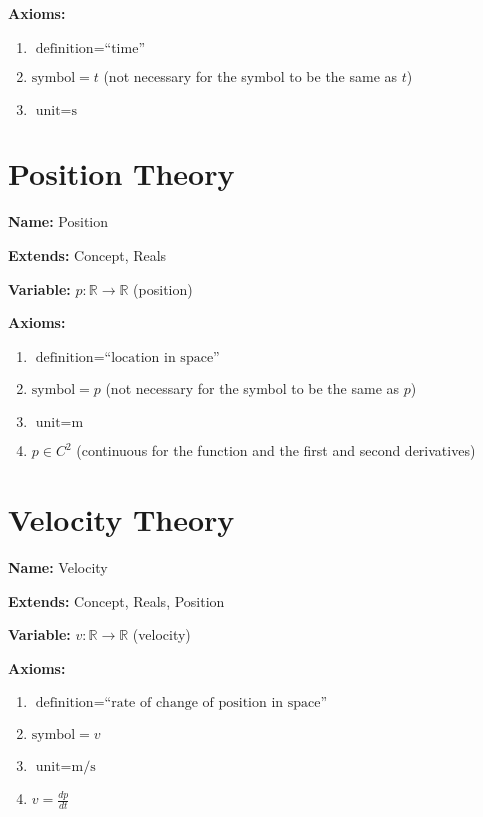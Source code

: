 \documentclass{article}
\begin{document}
\noindent \textbf{Axioms:}

\begin{enumerate}
    \item $\text{definition} = \text{``time''}$ 
    \item $\text{symbol} = t$ (not necessary for the symbol to be the same as $t$)
    \item $\text{unit} = \text{s}$
\end{enumerate}

\section{Position Theory}

\noindent \textbf{Name:} Position

\noindent \textbf{Extends:} Concept, Reals

\noindent \textbf{Variable:} $p: {\mathbb{R} \rightarrow \mathbb{R}}$ (position)

\noindent \textbf{Axioms:}

\begin{enumerate}
    \item $\text{definition} = \text{``location in space''}$ 
    \item $\text{symbol} = p$ (not necessary for the symbol to be the same as $p$)
    \item $\text{unit} = \text{m}$
    \item $p \in C^2$ (continuous for the function and the first and second derivatives)
\end{enumerate}


\section{Velocity Theory}

\noindent \textbf{Name:} Velocity

\noindent \textbf{Extends:} Concept, Reals, Position

\noindent \textbf{Variable:} $v: {\mathbb{R} \rightarrow \mathbb{R}}$ (velocity)

\noindent \textbf{Axioms:}

\begin{enumerate}
    \item $\text{definition} = \text{``rate of change of position in space''}$ 
    \item $\text{symbol} = v$
    \item $\text{unit} = \text{m/s}$
    \item $v = \frac{dp}{dt}$
\end{enumerate}
\end{document}
